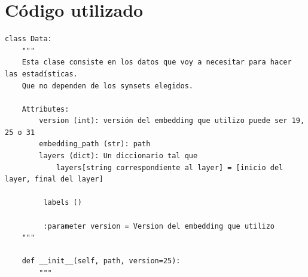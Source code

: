 \documentclass[12,twoside]{TFG-GM}
\theoremstyle{definition}
\theoremstyle{remark}
\begin{document}
\section{Código utilizado}
\begin{verbatim}
class Data:
    """
    Esta clase consiste en los datos que voy a necesitar para hacer las estadísticas.
    Que no dependen de los synsets elegidos.

    Attributes:
        version (int): versión del embedding que utilizo puede ser 19, 25 o 31
        embedding_path (str): path
        layers (dict): Un diccionario tal que
            layers[string correspondiente al layer] = [inicio del layer, final del layer]

         labels ()

         :parameter version = Version del embedding que utilizo
    """

    def __init__(self, path, version=25):
        """


\end{verbatim}
\end{document}
